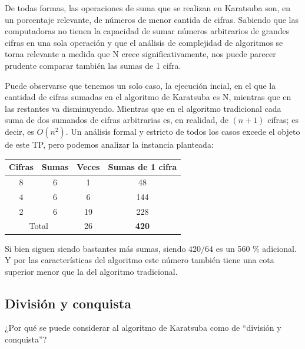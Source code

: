 \documentclass[titlepage,a4paper]{article}
\begin{document}
De todas formas, las operaciones de suma que se realizan en Karatsuba son, en un porcentaje relevante,
de números de menor cantida de cifras. Sabiendo que las computadoras no tienen la capacidad de sumar
números arbitrarios de grandes cifras en una sola operación y que el análisis de complejidad de
algoritmos se torna relevante a medida que N crece significativamente, nos puede parecer prudente
comparar también las sumas de 1 cifra.

Puede observarse que tenemos un solo caso, la ejecución incial, en el que la cantidad de cifras sumadas
en el algoritmo de Karatsuba es N, mientras que en las restantes va disminuyendo.
Mientras que en el algoritmo tradicional cada suma de dos sumandos de cifras arbitrarias es,
en realidad, de $(n+1)$ cifras; es decir, es $O(n^2)$. Un análisis formal y estricto de todos los casos
excede el objeto de este TP, pero podemos analizar la instancia planteada:

\begin{table}[H]
    \begin{tabular}{@{}cccc@{}}
    \toprule
    \textbf{Cifras} & \textbf{Sumas} & \textbf{Veces} & \textbf{Sumas de 1 cifra} \\ \midrule
    8               & 6              & 1              & 48                        \\
    4               & 6              & 6              & 144                       \\
    2               & 6              & 19             & 228                       \\
    \multicolumn{2}{c}{Total}        & 26             & \textbf{420}              \\ \bottomrule
    \end{tabular}
    \end{table}

Si bien siguen siendo bastantes más sumas, siendo $420/64$ es un 560 \% adicional.
Y por las características del algoritmo este número también tiene una cota superior menor que
la del algoritmo tradicional.

\subsection{División y conquista}

\begin{tcolorbox}[colback=blue!5!white,colframe=blue!75!black,title=Enunciado 1.4]
    ¿Por qué se puede considerar al algoritmo de Karatsuba como de “división y conquista”?
\end{tcolorbox}
\end{document}

